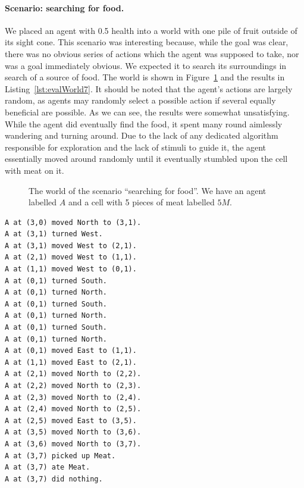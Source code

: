\paragraph{Scenario: searching for food.} We placed an agent with 0.5 health into a world with one pile of fruit outside of its sight cone. This scenario was interesting because, while the goal was clear, there was no obvious series of actions which the agent was supposed to take, nor was a goal immediately obvious. We expected it to search its surroundings in search of a source of food. The world is shown in Figure~\ref{fig:evalWorld7} and the results in Listing~\ref{lst:evalWorld7}. It should be noted that the agent's actions are largely random, as agents may randomly select a possible action if several equally beneficial are possible. As we can see, the results were somewhat unsatisfying. While the agent did eventually find the food, it spent many round aimlessly wandering and turning around. Due to the lack of any dedicated algorithm responsible for exploration and the lack of stimuli to guide it, the agent essentially moved around randomly until it eventually stumbled upon the cell with meat on it.

\begin{figure}
    \centering
    
    \caption{The world of the scenario ``searching for food''. We have an agent labelled $A$ and a cell with 5 pieces of meat labelled $5M$.}
    \label{fig:evalWorld7}
\end{figure}

\begin{lstlisting}[caption=Actions in the scenario ``searching for food''., label=lst:evalWorld7]
A at (3,0) moved North to (3,1).
A at (3,1) turned West.
A at (3,1) moved West to (2,1).
A at (2,1) moved West to (1,1).
A at (1,1) moved West to (0,1).
A at (0,1) turned South.
A at (0,1) turned North.
A at (0,1) turned South.
A at (0,1) turned North.
A at (0,1) turned South.
A at (0,1) turned North.
A at (0,1) moved East to (1,1).
A at (1,1) moved East to (2,1).
A at (2,1) moved North to (2,2).
A at (2,2) moved North to (2,3).
A at (2,3) moved North to (2,4).
A at (2,4) moved North to (2,5).
A at (2,5) moved East to (3,5).
A at (3,5) moved North to (3,6).
A at (3,6) moved North to (3,7).
A at (3,7) picked up Meat.
A at (3,7) ate Meat.
A at (3,7) did nothing.
\end{lstlisting}

